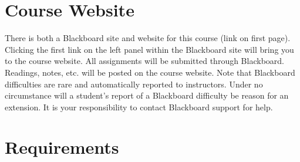 \documentclass[article,oneside]{memoir}
\begin{document}
\section{Course Website}
There is both a Blackboard site and website for this course (link on first page). Clicking the first link on the left panel within the Blackboard site will bring you to the course website. All assignments will be submitted through Blackboard. Readings, notes, etc. will be posted on the course website. Note that Blackboard difficulties are rare and automatically reported to instructors. Under no circumstance will a student's report of a Blackboard difficulty be reason for an extension. It is your responsibility to contact Blackboard support for help.


\section{Requirements}
\end{document}
